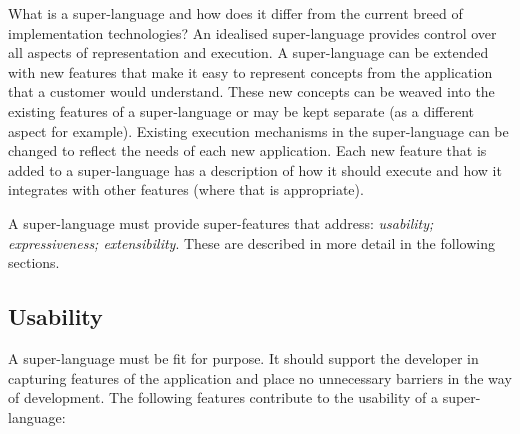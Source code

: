 What is a super-language and how does it differ from the current breed
of implementation technologies? An idealised super-language provides
control over all aspects of representation and execution. A super-language
can be extended with new features that make it easy to represent concepts
from the application that a customer would understand. These new concepts
can be weaved into the existing features of a super-language or may
be kept separate (as a different aspect for example). Existing execution
mechanisms in the super-language can be changed to reflect the needs
of each new application. Each new feature that is added to a super-language
has a description of how it should execute and how it integrates with
other features (where that is appropriate). 

A super-language must provide super-features that address: \emph{usability;
expressiveness; extensibility}. These are described in more detail
in the following sections.


\subsection{Usability}

A super-language must be fit for purpose. It should support the developer
in capturing features of the application and place no unnecessary
barriers in the way of development. The following features contribute
to the usability of a super-language:

